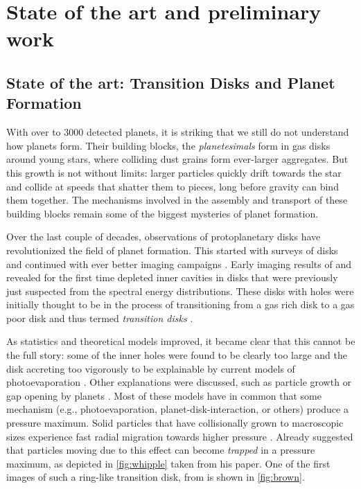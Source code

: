\documentclass[10pt,fleqn,twoside]{article}
\begin{document}
\section{State of the art and preliminary work}

\subsection*{State of the art: Transition Disks and Planet Formation}

With over to 3000 detected planets, it is striking that we still do
not understand how planets form. Their building blocks, the
\textit{planetesimals} form in gas disks around young stars, where
colliding dust grains form ever-larger aggregates. But this growth is
not without limits: larger particles quickly drift towards the star
and collide at speeds that shatter them to pieces, long before gravity
can bind them together. The mechanisms involved in the assembly and
transport of these building blocks remain some of the biggest
mysteries of planet formation.

Over the last couple of decades, observations of protoplanetary disks
have revolutionized the field of planet formation. This started with
surveys of disks \citep[see the review of][]{2011ARA&A..49...67W} and
continued with ever better imaging campaigns \citep[e.g.,][and many
others]{2007ApJ...659..705A,2009ApJ...704..496B}.
Early imaging results of \citet{2008ApJ...675L.109B} and
\citet{2009ApJ...704..496B} revealed for the first time depleted inner
cavities in disks that were previously just suspected from the
spectral energy distributions. These disks with holes were initially
thought to be in the process of transitioning from a gas rich disk
to a gas poor disk \cite[e.g.,][]{2001MNRAS.328..485C} and thus termed
\textit{transition disks} \citep[see][and references
therein]{2014prpl.conf..497E,2014prpl.conf..475A}.

As statistics and theoretical models improved, it became clear that
this cannot be the full story: some of the inner holes were found to
be clearly too large and the disk accreting too vigorously to be
explainable by current models of photoevaporation
\citep[i.e.\ Type 2 TDs,][]{2010MNRAS.401.1415O,2011MNRAS.412...13O}.
Other explanations were discussed, such as particle growth
\citep{2005A&A...434..971D,2005ApJ...625..414T,2012A&A...544A..79B} or
gap opening by planets
\citep{2004A&A...425L...9P,2006A&A...453.1129P,2006MNRAS.373.1619R,
2012A&A...545A..81P,2012ApJ...755....6Z}. Most of these models have in
common that some mechanism (e.g., photoevaporation,
planet-disk-interaction, or others) produce a pressure maximum.
Solid particles that have collisionally grown to macroscopic sizes
experience fast radial migration towards higher pressure
\citep{1972fpp..conf..211W,1977MNRAS.180...57W,1986Icar...67..375N}.
Already \citet{1972fpp..conf..211W} suggested that particles moving
due to this effect can become \textit{trapped} in a pressure maximum,
as depicted in \cref{fig:whipple} taken from his paper. One of the
first images of such a ring-like transition disk, from
\cite{2009ApJ...704..496B} is shown in \cref{fig:brown}.
\end{document}
